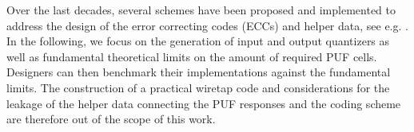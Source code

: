 Over the last decades, several schemes have been proposed and implemented to address the design of the error correcting codes (ECCs) and helper data, see e.g. \cite{DGSV15,HKS20}. In the following, we focus on the generation of input and output quantizers as well as fundamental theoretical limits on the amount of required PUF cells. Designers can then benchmark their implementations against the fundamental limits. The construction of a practical wiretap code and considerations for the leakage of the helper data connecting the PUF responses and the coding scheme are therefore out of the scope of this work.